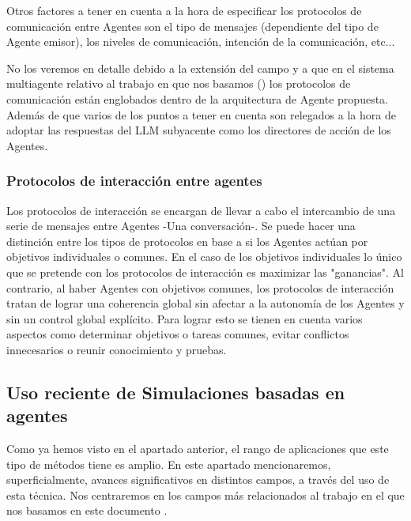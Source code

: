 Otros factores a tener en cuenta a la hora de especificar los protocolos de comunicación entre Agentes son el tipo de mensajes (dependiente del tipo de Agente emisor), los niveles de comunicación, intención de la comunicación, etc... 

No los veremos en detalle debido a la extensión del campo y a que en el sistema multiagente relativo al trabajo en que nos basamos (\cite{park2023generative}) los protocolos de comunicación están englobados dentro de la arquitectura de Agente propuesta. Además de que varios de los puntos a tener en cuenta son relegados a la hora de adoptar las respuestas del LLM subyacente como los directores de acción de los Agentes.

\subsubsection{Protocolos de interacción entre agentes}

Los protocolos de interacción se encargan de llevar a cabo el intercambio de una serie de mensajes entre Agentes -Una conversación-. Se puede hacer una distinción entre los tipos de protocolos en base a si los Agentes actúan por objetivos individuales o comunes. En el caso de los objetivos individuales lo único que se pretende con los protocolos de interacción es maximizar las "ganancias". Al contrario, al haber Agentes con objetivos comunes, los protocolos de interacción tratan de lograr una coherencia global sin afectar a la autonomía de los Agentes y sin un control global explícito. Para lograr esto se tienen en cuenta varios aspectos como determinar objetivos o tareas comunes, evitar conflictos innecesarios o reunir conocimiento y pruebas.

\subsection{Uso reciente de Simulaciones basadas en agentes}

Como ya hemos visto en el apartado anterior, el rango de aplicaciones que este tipo de métodos tiene es amplio. En este apartado mencionaremos, superficialmente, avances significativos en distintos campos, a través del uso de esta técnica. Nos centraremos en los campos más relacionados al trabajo en el que nos basamos en este documento \cite{park2023generative}.

